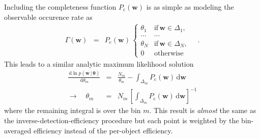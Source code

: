 \documentclass[12pt,preprint]{aastex}
\newcommand{\dd}{\ensuremath{\,\mathrm{d}}}
\newcommand{\bvec}[1]{\ensuremath{\boldsymbol{#1}}}
\newcommand{\rate}{\ensuremath{\Gamma}}
\newcommand{\ratepar}{{\ensuremath{\theta}}}
\newcommand{\ratepars}{{\ensuremath{\bvec{\ratepar}}}}
\newcommand{\completeness}{{\ensuremath{P_\mathrm{c}}}}
\newcommand{\entry}{{\ensuremath{\bvec{w}}}}
\newcommand{\catalog}{{\ensuremath{\bvec{\entry}}}}
\newcommand{\binarea}{{\ensuremath{\Delta}}}
\begin{document}
Including the completeness function $\completeness(\entry)$ is as simple as
modeling the observable occurence rate as
\begin{eqnarray}
\rate (\entry) &=& \completeness(\entry) \, \left \{\begin{array}{ll}
\ratepar_1 & \mathrm{if\,} \entry \in \binarea_1, \\
\cdots & \cdots \\
\ratepar_N & \mathrm{if\,} \entry \in \binarea_N, \\
0 & \mathrm{otherwise}
\end{array}\right. \quad.
\end{eqnarray}
This leads to a similar analytic maximum likelihood solution
\begin{eqnarray}
\frac{\dd \ln p(\catalog\,|\,\ratepars)}{\dd \ratepar_m} &=&
    \frac{N_m}{\ratepar_m}
    - \int_{\binarea_m} \completeness(\entry)\dd\entry \\
\to \quad \ratepar_m &=& N_m \,
    \left [\int_{\binarea_m} \completeness(\entry)\dd\entry \right ]^{-1}
\end{eqnarray}
where the remaining integral is over the bin $m$.
This result is \emph{almost} the same as the inverse-detection-efficiency
procedure but each point is weighted by the bin-averaged efficiency instead of
the per-object efficiency.
\end{document}

